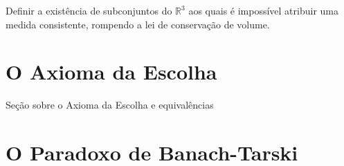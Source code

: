 \begin{definicao}
    \label{def:nao_mensuravel}
    Definir a existência de subconjuntos do \(\mathbb{R}^3\) aos quais é impossível atribuir uma medida consistente, rompendo a lei de conservação de volume.
\end{definicao}

\section{O Axioma da Escolha}

Seção sobre o Axioma da Escolha e equivalências

\section{O Paradoxo de Banach-Tarski}

